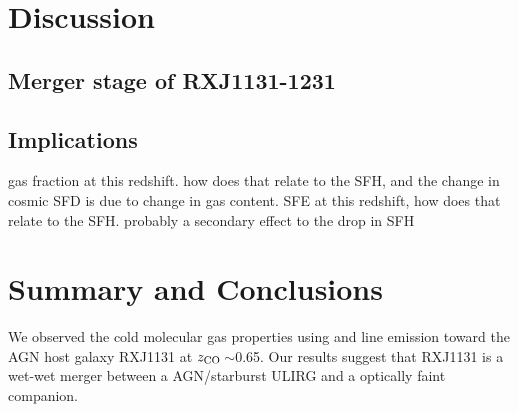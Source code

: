 \documentclass[]{emulateapj}
\begin{document}
\section{Discussion}
\subsection{Merger stage of RXJ1131-1231}



\subsection{Implications}
gas fraction at this redshift. how does that relate to
the SFH, and the change in cosmic SFD is due to change in gas content.
SFE at this redshift, how does that relate to the SFH. probably a secondary effect to the drop in SFH


\section{Summary and Conclusions}
We observed the cold molecular gas properties using \bco and \cco line emission
toward the AGN host galaxy RXJ1131 at $z_{\rm CO}$\,$\sim$0.65.
Our results suggest that RXJ1131 is a wet-wet merger between a AGN/starburst
ULIRG and a optically faint companion.






\acknowledgments




\end{document}
